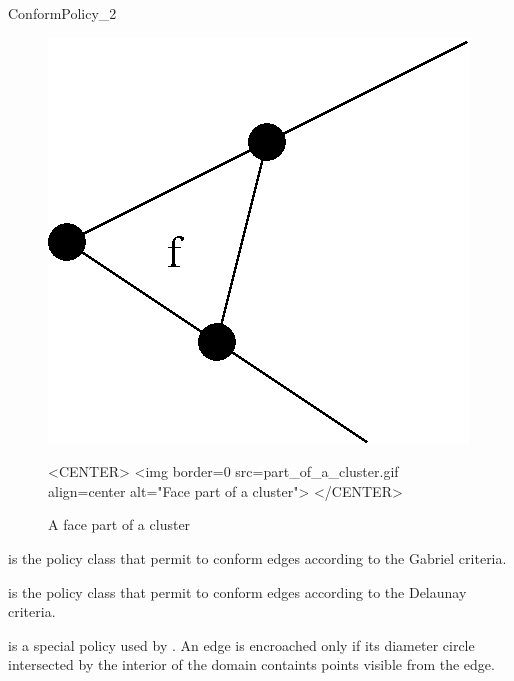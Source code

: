 \begin{ccRefConcept}{ConformPolicy_2}
\begin{figure}
\begin{ccTexOnly}
\begin{center}
\includegraphics{Mesh_2_ref/part_of_a_cluster.eps}
\end{center}
\end{ccTexOnly}
\caption{A face part of a cluster}
\label{part_of_a_cluster}
\begin{ccHtmlOnly}
<CENTER>
<img border=0 src=part_of_a_cluster.gif align=center alt="Face part of
a cluster">
</CENTER>
\end{ccHtmlOnly}
\end{figure}


\ccCreation
{}



\ccHasModels
{} is the policy class that permit to
conform edges according to the Gabriel criteria.

 is the policy class that permit to
conform edges according to the Delaunay criteria.

 is a special policy used by
. An edge is encroached only if its diameter circle
intersected by the interior of the domain containts points visible
from the edge.




\end{ccRefConcept}